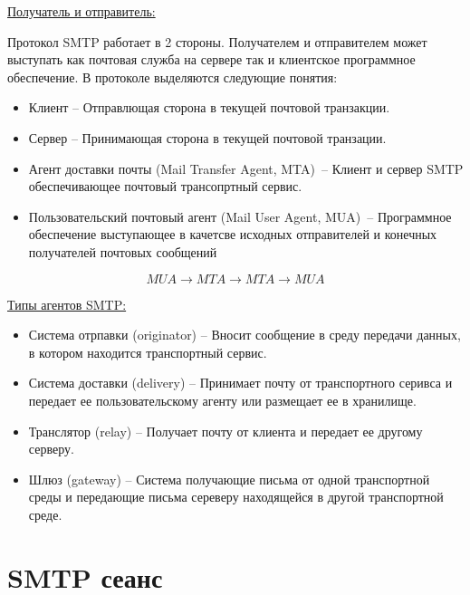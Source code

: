 \documentclass[a4paper,12pt]{report}
\begin{document}
	 \underline{Получатель и отправитель:}
	 
	 Протокол SMTP работает в 2 стороны. Получателем и отправителем может выступать как почтовая служба на сервере так и клиентское программное обеспечение. В протоколе выделяются следующие понятия:
	 \begin{itemize}
	     \item Клиент -- Отправлющая сторона в текущей почтовой транзакции.
	     \item Сервер -- Принимающая сторона в текущей почтовой транзации.
	     \item Агент доставки почты (Mail Transfer Agent, MTA)~-- Клиент и сервер SMTP обеспечивающее почтовый трансопртный сервис.
	     \item Пользовательский почтовый агент (Mail User Agent, MUA)~-- Программное обеспечение выступающее в качетсве исходных отправителей и конечных получателей почтовых сообщений
	 \end{itemize}
	 $$MUA\rightarrow MTA \rightarrow MTA \rightarrow MUA$$
	 
	 \underline{Типы агентов SMTP:}
	 
	 \begin{itemize}
	     \item Система отрпавки (originator) -- Вносит сообщение в среду передачи данных, в котором находится транспортный сервис.
	     \item Система доставки (delivery) -- Принимает почту от транспортного серивса и передает ее пользовательскому агенту или размещает ее в хранилище.
	     \item Транслятор (relay) -- Получает почту от клиента и передает ее другому серверу.
	     \item Шлюз (gateway) -- Система получающие письма от одной транспортной среды и передающие письма сереверу находящейся в другой транспортной среде.
	 \end{itemize}
	 
	 
	 \section{SMTP сеанс}
	 
\end{document}

